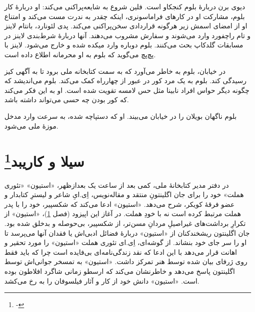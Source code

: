\documentclass[12pt]{book}
\newcommand{\noun}[1]{«{#1}»}
\begin{document}
    دیوی برن دربارۀ بلوم کنجکاو است. فلین شروع به شایعه‌پراکنی می‌کند: او دربارۀ کار بلوم، مشارکت او در کارهای فراماسونری، اینکه چقدر به ندرت مست می‌کند و امتناع او از امضای اسمش زیر هرگونه قراردادی سخن‌پراکنی می‌کند. پدی لئونارد، بانتام لاینز و تام راچفورد وارد می‌شوند و سفارش مشروب می‌دهند. آنها دربارۀ شرط‌بندی لاینز در مسابقات گلدکاپ بحث می‌کنند. بلوم دوباره وارد میکده شده و خارج می‌شود. لاینز با پچ‌پچ می‌گوید که بلوم به او محرمانه اطلاع داده است.

    در خیابان، بلوم به خاطر می‌آورد که به سمت کتابخانه ملی برود تا به آگهی کیز رسیدگی کند. بلوم به یک مرد کور در عبور از چهارراه کمک می‌کند. بلوم می‌اندیشد که چگونه دیگر حواس افراد نابینا مثل حس لامسه تقویت شده است. او به این فکر می‌کند که کور بودن چه حسی می‌تواند داشته باشد.

    بلوم ناگهان بویلان را در خیابان می‌بیند. او که دستپاچه شده، به سرعت وارد مدخل موزۀ ملی می‌شود.

    \chapter[سیلا و کاریبد]{سیلا و کاریبد\protect\footnote{-}}\label{ep:9}
    در دفتر مدیر کتابخانۀ ملی، کمی بعد از ساعت یک بعدازظهر، \noun{استیون} «تئوری هملت» خود را برای جان اگلینتونِ منتقد و مقاله‌نویس، اِی.ایِ شاعر و لیسترِ کتابدار و عضو فرقۀ کویکر، شرح می‌دهد. \noun{استیون} ادعا می‌کند که شکسپیر، خود را با پدر هملت مرتبط کرده است نه با خودِ هملت. در آغاز این اپیزود (فصل \ref{ep:9})، \noun{استیون} از تکرارِ برداشت‌های غیراصیلِ مردانِ مسن‌تر، از شکسپیر، بی‌حوصله و بدخلق شده بود. جان اگلینتون ریشخندکنان از \noun{استیون} دربارۀ فضائل ادبی‌اش یا فقدان آنها می‌پرسد تا او را سر جای خود بنشاند. از گوشه‌ای، اِی.ای تئوری هملت \noun{استیون} را مورد تحقیر و اهانت قرار می‌دهد با این ادعا که نقد زندگی‌نامه‌ای بی‌فایده است چرا که باید فقط روی ژرفای بیان شده توسط هنر تمرکز داشت. \noun{استیون} به تمسخر جوانی‌اش توسط اگلینتون پاسخ می‌دهد و خاطرنشان می‌کند که ارسطو زمانی شاگرد افلاطون بوده است. \noun{استیون} دانش خود از کار و آثار فیلسوفان را به رخ می‌کشد.
\end{document}
